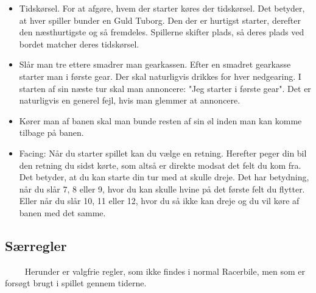 \documentclass[12pt]{article}
\begin{document}
\begin{itemize}

\item Tidskørsel. For at afgøre, hvem der starter køres der tidskørsel. Det betyder, at hver spiller bunder en Guld Tuborg. Den der er hurtigst starter, derefter den næsthurtigste og så fremdeles. Spillerne skifter plads, så deres plads ved bordet matcher deres tidskørsel.

\item Slår man tre ettere smadrer man gearkassen. Efter en smadret gearkasse starter man i første gear. Der skal naturligvis drikkes for hver nedgearing. I starten af sin næste tur skal man annoncere: "Jeg starter i første gear". Det er naturligvis en generel fejl, hvis man glemmer at annoncere.

\item Kører man af banen skal man bunde resten af sin øl inden man kan komme tilbage på banen.

\item Facing: Når du starter spillet kan du vælge en retning. Herefter peger din bil den retning du sidst kørte, som altså er direkte modsat det felt du kom fra. Det betyder, at du kan starte din tur med at skulle dreje. Det har betydning, når du slår 7, 8 eller 9, hvor du kan skulle hvine på det første felt du flytter. Eller når du slår 10, 11 eller 12, hvor du så ikke kan dreje og du vil køre af banen med det samme.

\end{itemize}

\subsection*{Særregler}

$\qquad$ Herunder er valgfrie regler, som ikke findes i normal Racerbile, men som er forsøgt brugt i spillet gennem tiderne.
\end{document}

